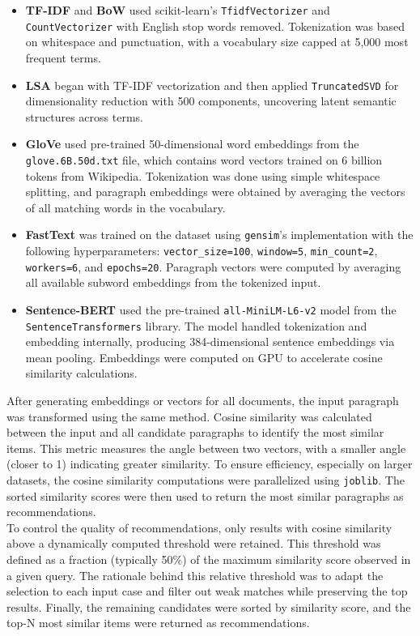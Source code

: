 \documentclass{llncs}
\begin{document}
\begin{itemize}
    \item \textbf{TF-IDF} and \textbf{BoW} used scikit-learn's \texttt{TfidfVectorizer} and \texttt{CountVectorizer} with English stop words removed. Tokenization was based on whitespace and punctuation, with a vocabulary size capped at 5,000 most frequent terms.

    \item \textbf{LSA} began with TF-IDF vectorization and then applied \texttt{TruncatedSVD} for dimensionality reduction with 500 components, uncovering latent semantic structures across terms.

    \item \textbf{GloVe} used pre-trained 50-dimensional word embeddings from the \texttt{glove.6B.50d.txt} file, which contains word vectors trained on 6 billion tokens from Wikipedia. Tokenization was done using simple whitespace splitting, and paragraph embeddings were obtained by averaging the vectors of all matching words in the vocabulary.

    \item \textbf{FastText} was trained on the dataset using \texttt{gensim}'s implementation with the following hyperparameters: \texttt{vector\_size=100}, \texttt{window=5}, \texttt{min\_count=2}, \texttt{workers=6}, and \texttt{epochs=20}. Paragraph vectors were computed by averaging all available subword embeddings from the tokenized input.

    \item \textbf{Sentence-BERT} used the pre-trained \texttt{all-MiniLM-L6-v2} model from the \texttt{SentenceTransformers} library. The model handled tokenization and embedding internally, producing 384-dimensional sentence embeddings via mean pooling. Embeddings were computed on GPU to accelerate cosine similarity calculations.
\end{itemize}
After generating embeddings or vectors for all documents, the input paragraph was transformed using the same method. Cosine similarity was calculated between the input and all candidate paragraphs to identify the most similar items. This metric measures the angle between two vectors, with a smaller angle (closer to 1) indicating greater similarity.
%
To ensure efficiency, especially on larger datasets, the cosine similarity computations were parallelized using \texttt{joblib}. 
The sorted similarity scores were then used to return the most similar paragraphs as recommendations.\\
%
To control the quality of recommendations, only results with cosine similarity above a dynamically computed threshold were retained. This threshold was defined as a fraction (typically 50\%) of the maximum similarity score observed in a given query. The rationale behind this relative threshold was to adapt the selection to each input case and filter out weak matches while preserving the top results. Finally, the remaining candidates were sorted by similarity score, and the top-N most similar items were returned as recommendations.
\end{document}
